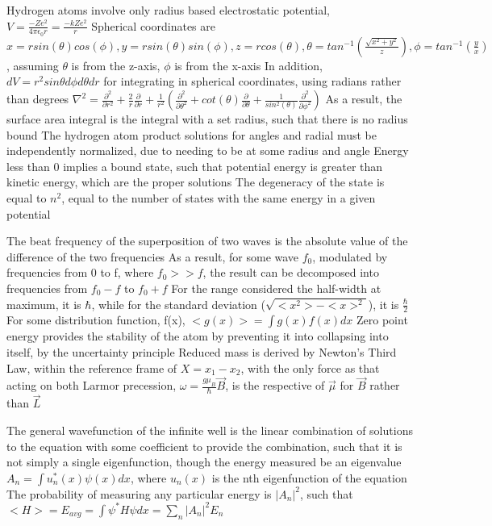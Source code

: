 \documentclass[11 pt, twoside]{article}
\newenvironment{outline*}
{
	\begin{outline}[enumerate]
	}
	{\end{outline}
}
\begin{document}
\begin{outline*}
\1 Hydrogen atoms involve only radius based electrostatic potential, $V = \frac{-Ze^2}{4\pi \epsilon_0 r} = \frac{-kZe^2}{r}$
	\2 Spherical coordinates are $x = rsin(\theta)cos(\phi), y = rsin(\theta)sin(\phi), z = rcos(\theta), \theta = tan^{-1}(\frac{\sqrt{x^2 + y^2}}{z}), \phi = tan^{-1}(\frac{y}{x})$, assuming $\theta$ is from the z-axis, $\phi$ is from the x-axis
		\3 In addition, $dV = r^2sin\theta d\phi d\theta dr$ for integrating in spherical coordinates, using radians rather than degrees
		\3 $\nabla^2 = \frac{\partial^2}{\partial r^2} + \frac{2}{r}\frac{\partial}{\partial r} + \frac{1}{r^2}(\frac{\partial^2}{\partial \theta^2} + cot(\theta)\frac{\partial}{\partial \theta} + \frac{1}{sin^2(\theta)}\frac{\partial^2}{\partial \phi^2})$
	\2 As a result, the surface area integral is the integral with a set radius, such that there is no radius bound
\1 The hydrogen atom product solutions for angles and radial must be independently normalized, due to needing to be at some radius and angle
	\2 Energy less than 0 implies a bound state, such that potential energy is greater than kinetic energy, which are the proper solutions
	\2 The degeneracy of the state is equal to $n^2$, equal to the number of states with the same energy in a given potential

\1 The beat frequency of the superposition of two waves is the absolute value of the difference of the two frequencies
	\2 As a result, for some wave $f_0$, modulated by frequencies from 0 to f, where $f_0 >> f$, the result can be decomposed into frequencies from $f_0 - f$ to $f_0 + f$
	\2 For the range considered the half-width at maximum, it is $\hbar$, while for the standard deviation ($\sqrt{<x^2> - <x>^2}$), it is $\frac{\hbar}{2}$
		\3 For some distribution function, f(x), $<g(x)> = \int g(x) f(x)dx$
\1 Zero point energy provides the stability of the atom by preventing it into collapsing into itself, by the uncertainty principle
\1 Reduced mass is derived by Newton's Third Law, within the reference frame of $X = x_1 - x_2$, with the only force as that acting on both
\1 Larmor precession, $\omega = \frac{g\mu_B}{\hbar}\vec{B}$, is the respective of $\vec{\mu}$ for $\vec{B}$ rather than $\vec{L}$

\1 The general wavefunction of the infinite well is the linear combination of solutions to the equation with some coefficient to provide the combination, such that it is not simply a single eigenfunction, though the energy measured be an eigenvalue
	\2 $A_n = \int u_n^*(x)\psi(x)dx$, where $u_n(x)$ is the nth eigenfunction of the equation
	\2 The probability of measuring any particular energy is $|A_n|^2$, such that $<H> = E_{avg} = \int \psi^* H \psi dx = \sum_n |A_n|^2E_n$


\end{outline*}
\end{document}
